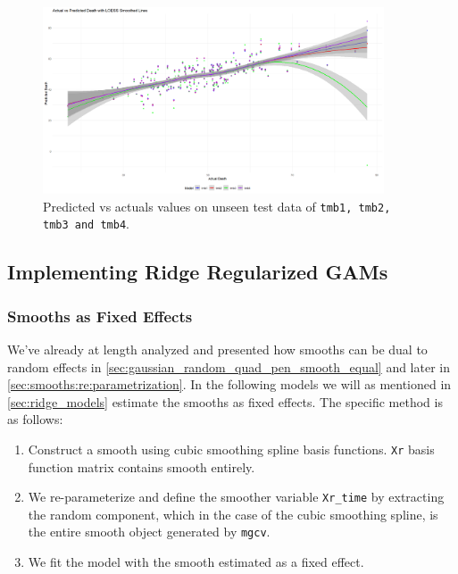 \documentclass[12pt, twoside,hidelinks]{article}
\theoremstyle{definition}
\numberwithin{equation}{section}
\begin{document}
\begin{figure}[H]
    \centering
    \includegraphics[width=0.9\textwidth]{visuals/Theory/overfit_tmb1234_pred_vs_act.png}
    \caption{Predicted vs actuals values on unseen test data of \texttt{tmb1, tmb2, tmb3 and tmb4}.}
    \label{fig:predicted_vs_actual_reglines_tmb1234}
\end{figure}

\subsection{Implementing Ridge Regularized GAMs}

\subsubsection{Smooths as Fixed Effects}\label{sec:ridge:smooth2random}

We've already at length analyzed and presented how smooths can be dual to random effects in \ref{sec:gaussian_random_quad_pen_smooth_equal} and later in \ref{sec:smooths:re:parametrization}. In the following models we will as mentioned in \ref{sec:ridge_models} estimate the smooths as fixed effects. The specific method is as follows: 

\begin{enumerate}
    \item Construct a smooth using cubic smoothing spline basis functions. \texttt{Xr} basis function matrix contains smooth entirely.
    \item We re-parameterize and define the smoother variable \texttt{Xr\_time} by extracting the random component, which in the case of the cubic smoothing spline, is the entire smooth object generated by \texttt{mgcv}. 
    \item We fit the model with the smooth estimated as a fixed effect. 
\end{enumerate}
\end{document}
